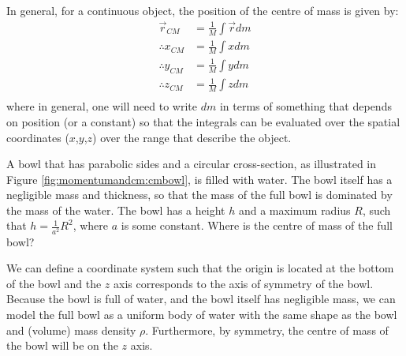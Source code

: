 In general, for a continuous object, the position of the centre of mass is given by:
\begin{align}
\vec r_{CM} &=\frac{1}{M}\int \vec r dm\nonumber\\
\therefore x_{CM} &= \frac{1}{M}\int x dm\nonumber\\
\therefore y_{CM} &=  \frac{1}{M}\int y dm\nonumber\\
\therefore z_{CM} &=  \frac{1}{M}\int z dm\\
\end{align}
where in general, one will need to write $dm$ in terms of something that depends on position (or a constant) so that the integrals can be evaluated over the spatial coordinates ($x$,$y$,$z$) over the range that describe the object.
\begin{example}{
A bowl that has parabolic sides and a circular cross-section, as illustrated in Figure \ref{fig:momentumandcm:cmbowl}, is filled with water. The bowl itself has a negligible mass and thickness, so that the mass of the full bowl is dominated by the mass of the water. The bowl has a height $h$ and a maximum radius $R$, such that $h=\frac{1}{a^2}R^2$, where $a$ is some constant. Where is the centre of mass of the full bowl?}

We can define a coordinate system such that the origin is located at the bottom of the bowl and the $z$ axis corresponds to the axis of symmetry of the bowl. Because the bowl is full of water, and the bowl itself has negligible mass, we can model the full bowl as a uniform body of water with the same shape as the bowl and (volume) mass density $\rho$. Furthermore, by symmetry, the centre of mass of the bowl will be on the $z$ axis. 


\end{example}
